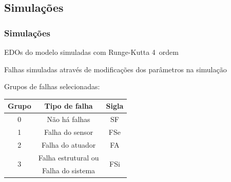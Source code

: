 \documentclass{beamer}
\begin{document}
\subsection{Simulações}
\begin{frame}
    \frametitle{Simulações}

    EDOs do modelo simuladas com Runge-Kutta 4\textordfeminine\ ordem

    \vspace{0.25cm}

    Falhas simuladas através de modificações dos parâmetros na simulação

    \vspace{0.25cm}

    Grupos de falhas selecionadas:

\begin{table}[!htb]
\small
\centering
\begin{tabular}{|c|c|c|}
\hline
{\bf Grupo} & {\bf Tipo de falha} & {\bf Sigla}\\
\hline
\hline
0 & Não há falhas & SF\\
\hline
1 & Falha do sensor & FSe\\
\hline
2 & Falha do atuador & FA\\
\hline
\multirow{2}{*}{3} & 
Falha estrutural ou & 
\multirow{2}{*}{FSi}\\
&
Falha do sistema & 
\\
\hline
\end{tabular}
\end{table}
\end{frame}
\end{document}

